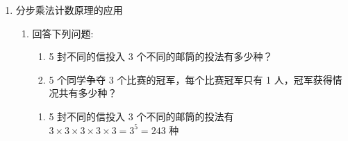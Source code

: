 \begin{enumerate}
\begin{enumerate}
\begin{jieda}
            当百位数是 1 , 后两位相加为 7 , 有 8 种; 当百位数是 2 , 后两位相加为 6 , 有 7 种;
            
            当百位数是 3 , 后两位相加为 5 , 有 6 种; 当百位数是 4 , 后两位相加为 4 , 有 5 种;
            
            当百位数是 5 , 后两位相加为 3 , 有 4 种; 当百位数是 6 , 后两位相加为 2 , 有 3 种;
            
            当百位数是 7 , 后两位相加为 1 , 有 2 种; 当百位数是 8 , 后两位相加为 0 , 有 1 种;
            
            总共有 $8 + 7 + 6 + 5 + 4 + 3 + 2 + 1 = {36}$ 种.
        \end{jieda}
        
        \item 数学中“凸数”是一个位数不低于 3 的奇位数，是最中间的数位上的数字比两边的数字都大的数，则没有重复数字且大于 564 的三位数中“凸数”的个数为
        \begin{jieda}
            最高位是 5 的“凸数”, 中间数分别为 7, 8, 9, 分别有 6, 7, 8 个, 共有 21 个;
            
            最高位是 6 的“凸数”，中间数分别为 7, 8, 9, 分别有 6, 7, 8 个, 共有 21 个;
            
            最高位是 7 的“凸数”, 中间数分别为 8, 9 , 分别有 7, 8 个，共有 15 个;
            
            最高位是 8 的“凸数”，中间数为 9 ，有 8 个，
            
            所以没有重复数字且大于 564 的三位数中“凸数”的个数为 ${21} + {21} + {15} + 8 = {65}$ .
        \end{jieda}
        
    \end{enumerate}
    
    \item 分步乘法计数原理的应用
    \begin{enumerate}
        \item 回答下列问题:
        \begin{enumerate}
            \item 5 封不同的信投入 3 个不同的邮筒的投法有多少种？
            \item 5 个同学争夺 3 个比赛的冠军，每个比赛冠军只有 1 人，冠军获得情况共有多少种？
        \end{enumerate}
        \begin{jieda}
            \begin{enumerate}
                \item 5 封不同的信投入 3 个不同的邮筒的投法有 $3 \times  3 \times  3 \times  3 \times  3 = {3}^{5} = {243}$ 种
                

\end{enumerate}
\end{jieda}
\end{enumerate}
\end{enumerate}
